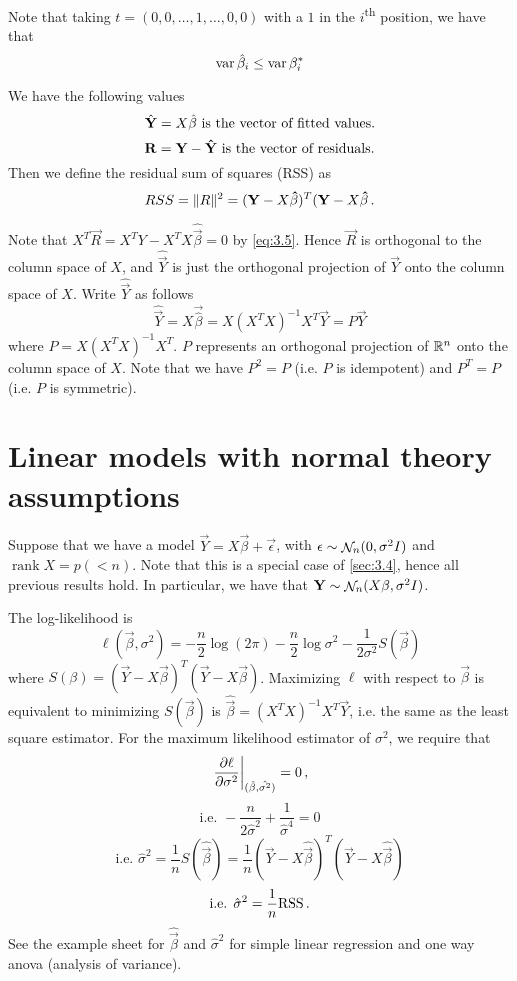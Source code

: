 Note that taking $t = (0, 0, \dotsc, 1, \dotsc, 0, 0)$ with a $1$ in the $i$\textsuperscript{th} position, we have that
\[
\operatorname{var} \hat{\beta}_i \leq \operatorname{var} \beta_i^*
\]

\begin{definition}
  We have the following values
\[
\hat{\vec{Y}} = X \hat{\vec{\beta}} \text{ is the vector of fitted values\index{fitted values}.}
\]
\[
\vec{R} = \vec{Y} - \vec{\hat{Y}} \text{ is the vector of residuals\index{residuals}.}
\]
Then we define the residual sum of squares (RSS) as
\[
RSS = \lVert R\rVert^2 = (\mathbf{Y} - X \mathbf{\hat{\beta}})^T(\mathbf{Y} - X \mathbf{\hat{\beta}} \, {.}
\]
\end{definition}

Note that $X^T \vec{R} = X^T Y - X^T X \hat{\vec{\beta}} = 0$ by \eqref{eq:3.5}.
Hence $\vec{R}$ is orthogonal to the column space of $X$, and $\hat{\vec{Y}}$ is just the orthogonal projection of $\vec{Y}$ onto the column space of $X$.
Write $\hat{\vec{Y}}$ as follows
\[
\hat{\vec{Y}} = X \vec{\hat{\beta}} = X(X^TX)^{-1}X^T\vec{Y} = P \vec{Y}
\]
where $P = X(X^TX)^{-1}X^T$. $P$ represents an orthogonal projection of $\mathbb{R}^n$ onto the column space of $X$.
Note that we have $P^2 = P$ (i.e. $P$ is idempotent) and $P^T = P$ (i.e. $P$ is symmetric).

\section{Linear models with normal theory assumptions}
\label{sec:3.5}
Suppose that we have a model $\vec{Y} = X \vec{\beta} + \vec{\epsilon}$, with $\mathbf{\epsilon} \sim \mathop{\mathcal{N}}_n(0, \sigma^2I)$ and $\mathop{rank} X = p ( < n)$.
Note that this is a special case of \cref{sec:3.4}, hence all previous results hold.
In particular, we have that $\mathbf{Y} \sim \mathop{\mathcal{N}}_n (X \mathbf{\beta}, \sigma^2 I)$.

The log-likelihood is
\[
\ell ( \vec{\beta}, \sigma^2 ) = -\frac{n}{2} \log (2 \pi) - \frac{n}{2} \log \sigma^2 - \frac{1}{2 \sigma^2} S(\vec{\beta})
\]
where $S(\beta) = (\vec{Y} - X \vec{\beta})^T(\vec{Y} - X \vec{\beta})$.
Maximizing $\ell$ with respect to $\vec{\beta}$ is equivalent to minimizing $S(\vec{\beta})$ is $\hat{\vec{\beta}} = (X^TX)^{-1}X^T\vec{Y}$, i.e. the same as the least square estimator.
For the maximum likelihood estimator of $\sigma^2$, we require that
\[
\left. \frac{\partial \ell}{\partial \sigma^2} \right\vert_{(\hat{\mathbf{\beta}}, \hat{\sigma^2})} = 0 \, {,}
\]
\[
\text{i.e. } -\frac{n}{2 \hat{\sigma}^2} + \frac{1}{\hat{\sigma}^4} = 0
\]
\[
\text{i.e. } \hat{\sigma}^2 = \frac{1}{n} S (\hat{\vec{\beta}}) = \frac{1}{n}(\vec{Y} - X \hat{\vec{\beta}})^T(\vec{Y} - X \hat{\vec{\beta}})
\]
\[
\text{i.e. } \hat{\sigma}^2 = \frac{1}{n}\mathrm{RSS} \, {.}
\]
See the example sheet for $\hat{\vec{\beta}}$ and $\hat{\sigma}^2$ for simple linear regression and one way anova (analysis of variance).

